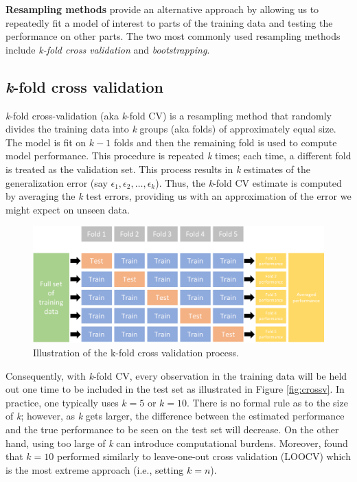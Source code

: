 \documentclass[]{krantz}
\begin{document}
\textbf{Resampling methods} provide an alternative approach by allowing us to repeatedly fit a model of interest to parts of the training data and testing the performance on other parts. The two most commonly used resampling methods include \emph{k-fold cross validation} and \emph{bootstrapping}.

\hypertarget{k-fold-cross-validation}{%
\subsection{\texorpdfstring{\emph{k}-fold cross validation}{k-fold cross validation}}\label{k-fold-cross-validation}}

\emph{k}-fold cross-validation (aka \emph{k}-fold CV) is a resampling method that randomly divides the training data into \emph{k} groups (aka folds) of approximately equal size. The model is fit on \(k-1\) folds and then the remaining fold is used to compute model performance. This procedure is repeated \emph{k} times; each time, a different fold is treated as the validation set. This process results in \emph{k} estimates of the generalization error (say \(\epsilon_1, \epsilon_2, \dots, \epsilon_k\)). Thus, the \emph{k}-fold CV estimate is computed by averaging the \emph{k} test errors, providing us with an approximation of the error we might expect on unseen data.

\begin{figure}

{\centering \includegraphics[width=0.9\linewidth,height=0.9\textheight]{images/cv} 

}

\caption{Illustration of the k-fold cross validation process.}\label{fig:02-cv}
\end{figure}

Consequently, with \emph{k}-fold CV, every observation in the training data will be held out one time to be included in the test set as illustrated in Figure \ref{fig:crossv}. In practice, one typically uses \(k = 5\) or \(k = 10\). There is no formal rule as to the size of \emph{k}; however, as \emph{k} gets larger, the difference between the estimated performance and the true performance to be seen on the test set will decrease. On the other hand, using too large of \emph{k} can introduce computational burdens. Moreover, \citet{molinaro2005prediction} found that \(k=10\) performed similarly to leave-one-out cross validation (LOOCV) which is the most extreme approach (i.e., setting \(k = n\)).
\end{document}
